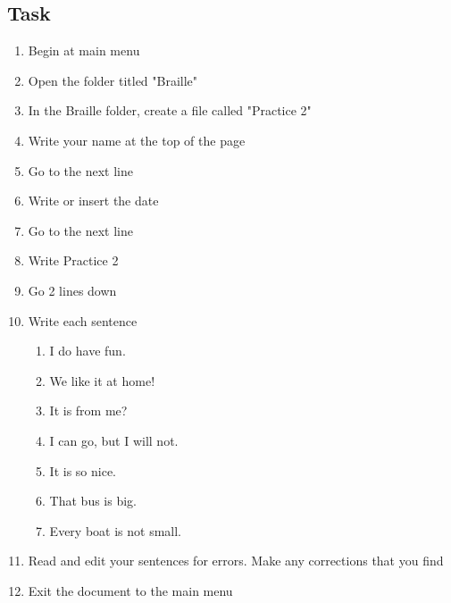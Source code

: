 \documentclass[10pt,letterpaper,twoside]{report}
\begin{document}
\subsection{Task}
\begin{enumerate}
	\item Begin at main menu
	\item Open the folder titled "Braille"
	\item In the Braille folder, create a file called "Practice 2"
	\item Write your name at the top of the page
	\item Go to the next line
	\item Write or insert the date
	\item Go to the next line
	\item Write Practice 2
	\item Go 2 lines down
	\item Write each sentence
	      \begin{enumerate}
		      \item I do have fun.
		      \item We like it at home!
		      \item It is from me?
		      \item I can go, but I will not.
		      \item It is so nice.
		      \item That bus is big.
		      \item Every boat is not small.
	      \end{enumerate}
	\item Read and edit your sentences for errors. Make any corrections that you find
	\item Exit the document to the main menu
\end{enumerate}

\clearpage
\end{document}
